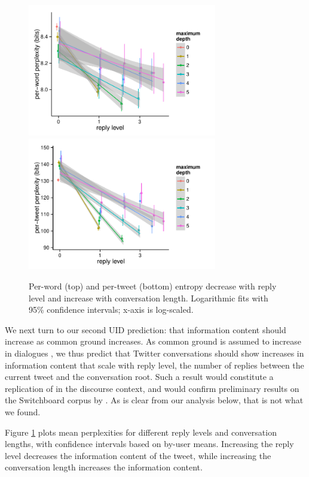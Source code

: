 \documentclass[11pt,letterpaper]{article}
\begin{document}
\begin{figure}[t]
 \centering
  \includegraphics[width=3.25in]{figures/cmcl-rlevel-pw.pdf}\vspace*{-.3em}
  \includegraphics[width=3.25in]{figures/cmcl-rlevel-pt.pdf}\vspace*{-.3em}
 \caption{Per-word (top) and per-tweet (bottom) entropy decrease with reply level and increase with conversation length.  Logarithmic fits with 95\% confidence intervals; x-axis is log-scaled.}\label{fig:rlevel-maxdesc}\vspace*{-.5em}
\end{figure}

We next turn to our second UID prediction: that information content should increase as common ground increases. As common ground is assumed to increase in dialogues \cite{clark1996}, we thus predict that Twitter conversations should show increases in information content that scale with reply level, the number of replies between the current tweet and the conversation root. Such a result would constitute a replication of  in the discourse context, and would confirm preliminary results on the Switchboard corpus by . As is clear from our analysis below, that is not what we found. 
	
Figure \ref{fig:rlevel-maxdesc} plots mean perplexities for different reply levels and conversation lengths, with confidence intervals based on by-user means. Increasing the reply level decreases the information content of the tweet, while increasing the conversation length increases the information content.
\end{document}
